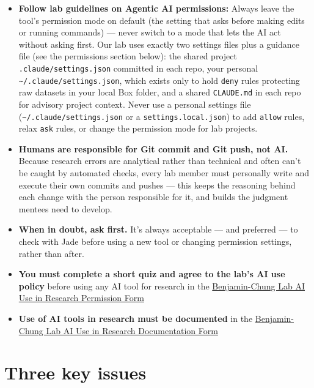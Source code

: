 \documentclass[
]{book}
\begin{document}
\begin{itemize}
  production data, credentials, or shared drives without lab PI
  approval. Disclose if an agentic tool was used to produce analysis
  code, and document this in commit messages or code comments.
\item
  \textbf{Follow lab guidelines on Agentic AI permissions:} Always leave the tool's permission mode on default (the setting that asks before making edits or running commands) --- never switch to a mode that lets the AI act without asking first. Our lab uses exactly two settings files plus a guidance file (see the permissions section below): the shared project \texttt{.claude/settings.json} committed in each repo, your personal \texttt{\textasciitilde{}/.claude/settings.json}, which exists only to hold \texttt{deny} rules protecting raw datasets in your local Box folder, and a shared \texttt{CLAUDE.md} in each repo for advisory project context. Never use a personal settings file (\texttt{\textasciitilde{}/.claude/settings.json} or a \texttt{settings.local.json}) to add \texttt{allow} rules, relax \texttt{ask} rules, or change the permission mode for lab projects.
\item
  \textbf{Humans are responsible for Git commit and Git push, not AI.} Because research errors are analytical rather than technical and often can't be caught by automated checks, every lab member must personally write and execute their own commits and pushes --- this keeps the reasoning behind each change with the person responsible for it, and builds the judgment mentees need to develop.
\item
  \textbf{When in doubt, ask first.} It's always acceptable --- and preferred ---
  to check with Jade before using a new tool or changing permission settings, rather than after.
\item
  \textbf{You must complete a short quiz and agree to the lab's AI use
  policy} before using any AI tool for research in the \href{https://forms.gle/6ZGJBDY9Qqq3Jn1j6}{Benjamin-Chung
  Lab AI Use in Research Permission
  Form}
\item
  \textbf{Use of AI tools in research must be documented} in the
  \href{https://docs.google.com/forms/d/e/1FAIpQLScphiuDTkUXH0RVFFuj-I4KqgmxXP796MfV9mLeQ2uY8k9mgA/viewform?usp=publish-editor}{Benjamin-Chung Lab AI Use in Research Documentation
  Form}
\end{itemize}

\section{Three key issues}\label{three-key-issues}
\end{document}
